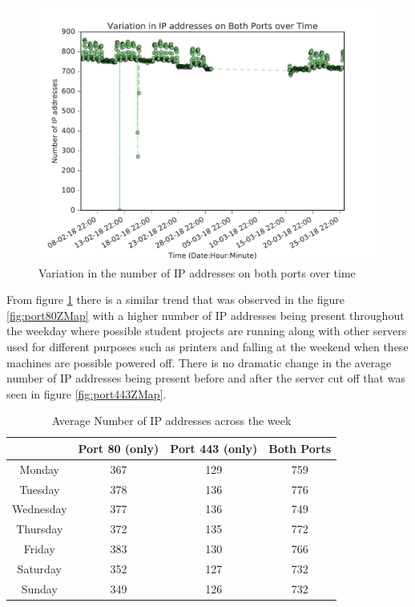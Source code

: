 \documentclass[a4wide,leqno,12pt]{report}
\begin{document}
\begin{figure}[H]
\centering
\includegraphics[scale=.5]{pdf_images/Ip_bp_alpha}
\caption{Variation in the number of IP addresses on both ports over time}
\label{fig:portsBothZMap}
\end{figure}
From figure \ref{fig:portsBothZMap} there is a similar trend that was observed in the figure \ref{fig:port80ZMap} with a higher number of IP addresses being present throughout the weekday where possible student projects are running along with other servers used for different purposes such as printers and falling at the weekend when these machines are possible powered off. There is no dramatic change in the average number of IP addresses being present before and after the server cut off that was seen in figure \ref{fig:port443ZMap}.

\begin{table}[H]
\centering
\begin{tabular}{||c c c c ||}
 \hline
  & Port 80 (only) & Port 443 (only) & Both Ports \\ [0.5ex]
 \hline\hline
 Monday & 367 & 129 & 759  \\
 Tuesday & 378 & 136 & 776 \\
 Wednesday & 377 & 136 & 749 \\
 Thursday & 372 & 135 & 772  \\
 Friday & 383 & 130 & 766 \\
 Saturday & 352 & 127 & 732\\
 Sunday & 349 & 126 & 732\\[1ex]
 \hline
\end{tabular}
\caption{Average Number of IP addresses across the week}
\label{table:1}
\end{table}
\end{document}
